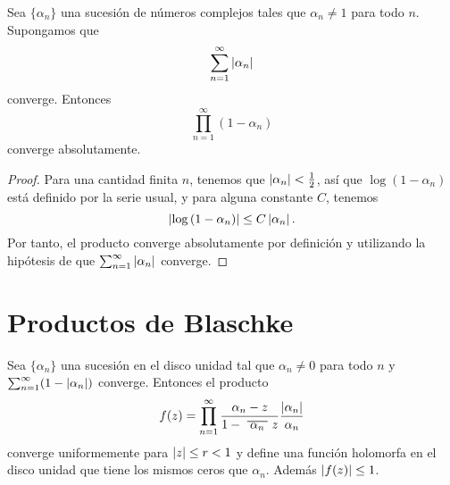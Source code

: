 \begin{lemma}
    \label{th:convergencia}
    Sea $\{\alpha_n\}$ una sucesión de números complejos tales que $\alpha_n \not = 1$ para todo $n$. Supongamos que
    \begin{equation*}
        \sum_{n=1}^{\infty} \left\lvert\alpha_n\right\rvert
    \end{equation*}
    converge. Entonces
    \begin{equation*}
        \prod_{n=1}^{\infty} (1 - \alpha_n)
    \end{equation*}
    converge absolutamente.
\end{lemma}

\begin{proof}
    Para una cantidad finita $n$, tenemos que $\left\lvert\alpha_n\right\rvert < \frac{1}{2}$, así que $\log{(1 - \alpha_n)}$ está definido por la serie usual, y para alguna constante $C$, tenemos
    \begin{equation*}
        \left\lvert\log{(1 - \alpha_n)}\right\rvert \leq C \left\lvert\alpha_n\right\rvert.
    \end{equation*}
    Por tanto, el producto converge absolutamente por definición y utilizando la hipótesis de que $\sum_{n=1}^{\infty} \left\lvert\alpha_n\right\rvert$ converge.
\end{proof}


\section{Productos de Blaschke}


\begin{prop}
    Sea $\{\alpha_n\}$ una sucesión en el disco unidad tal que $\alpha_n \not = 0$ para todo $n$ y $\sum_{n=1}^{\infty} (1 - \left\lvert\alpha_n\right\rvert)$ converge. Entonces el producto
    \begin{equation*}
        f(z) = \prod_{n=1}^{\infty} \frac{\alpha_n - z}{1 - \xbar{\alpha_n}z} \dfrac{\abs{\alpha_n}}{\alpha_n}
    \end{equation*}
    converge uniformemente para $\left\lvert z\right\rvert \leq r < 1$ y define una función holomorfa en el disco unidad que tiene los mismos ceros que $\alpha_n$. Además $\left\lvert f(z)\right\rvert \leq 1$.
\end{prop}

